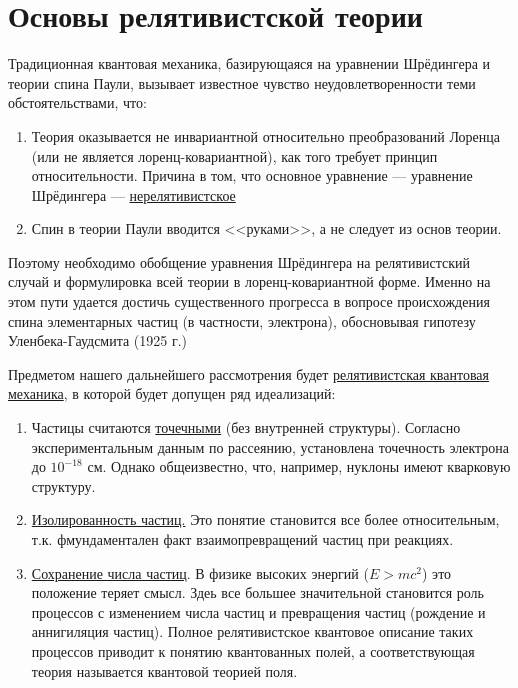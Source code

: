 \chapter{Основы релятивистской теории}

Традиционная квантовая механика, базирующаяся на уравнении Шрёдингера и теории спина Паули, вызывает известное чувство неудовлетворенности теми обстоятельствами, что:

\begin{sloppypar}
\begin{enumerate}
\item{Теория оказывается не инвариантной относительно преобразований Лоренца (или не является лоренц-ковариантной), как того требует принцип относительности. Причина в том, что основное уравнение --- уравнение Шрёдингера --- \underline{нерелятивистское}}
\item{Спин в теории Паули вводится <<руками>>, а не следует из основ теории.}
\end{enumerate}
\end{sloppypar}

Поэтому необходимо обобщение уравнения Шрёдингера на релятивистский случай и формулировка всей теории в лоренц-ковариантной форме. Именно на этом пути удается достичь существенного прогресса в вопросе происхождения спина элементарных частиц (в частности, электрона), обосновывая гипотезу Уленбека-Гаудсмита (1925 г.)

Предметом нашего дальнейшего рассмотрения будет \underline{релятивистская квантовая механика}, в которой будет допущен ряд идеализаций:
\begin{enumerate}
\item{Частицы считаются \underline{точечными} (без внутренней структуры). Согласно экспериментальным данным по рассеянию, установлена точечность электрона до $10^{-18}$ см. Однако общеизвестно, что, например, нуклоны имеют кварковую структуру.}

\item{\underline{Изолированность частиц.} Это понятие становится все более относительным, т.к. фмундаментален факт взаимопревращений частиц при реакциях.}
\item{\underline{Сохранение числа частиц}. В физике высоких энергий ($E > mc^2$) это положение теряет смысл. Здеь все большее значительной становится роль процессов с изменением числа частиц и превращения частиц (рождение и аннигиляция частиц). Полное релятивистское квантовое описание таких процессов приводит к понятию квантованных полей, а соответствующая теория называется квантовой теорией поля.}
\end{enumerate}


